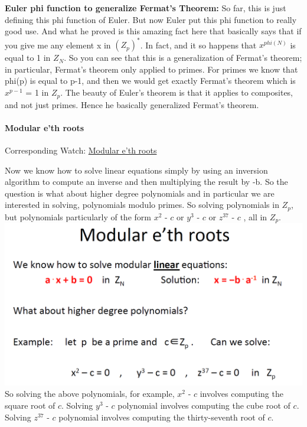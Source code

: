 \documentclass[11pt]{article}
\makeatletter
\def\maxwidth{\ifdim\Gin@nat@width>\linewidth\linewidth
    \else\Gin@nat@width\fi}
\let\Oldincludegraphics\includegraphics
\renewcommand{\includegraphics}[1]{\Oldincludegraphics[width=.8\maxwidth]{#1}}
\makeatother
\begin{document}
\textbf{Euler phi function to generalize Fermat's Theorem:} So far, this
is just defining this phi function of Euler. But now Euler put this phi
function to really good use. And what he proved is this amazing fact
here that basically says that if you give me any element x in
\((Z_{p})^{*}\). In fact, and it so happens that \(x^{phi(N)}\) is equal
to 1 in \(Z_{N}\). So you can see that this is a generalization of
Fermat's theorem; in particular, Fermat's theorem only applied to
primes. For primes we know that phi(p) is equal to p-1, and then we
would get exactly Fermat's theorem which is \(x^{p-1}\) = 1 in
\(Z_{p}\). The beauty of Euler's theorem is that it applies to
composites, and not just primes. Hence he basically generalized Fermat's
theorem.

\hypertarget{modular-eth-roots}{%
\paragraph{Modular e'th roots}\label{modular-eth-roots}}

Corresponding Watch:
\href{https://www.coursera.org/learn/crypto/lecture/fjRVO/modular-e-th-roots}{Modular
e'th roots}

Now we know how to solve linear equations simply by using an inversion
algorithm to compute an inverse and then multiplying the result by -b.
So the question is what about higher degree polynomials and in
particular we are interested in solving, polynomials modulo primes. So
solving polynomials in \(Z_{p}\), but polynomials particularly of the
form \(x^{2}\) - \(c\) or \(y^{3}\) - \(c\) or \(z^{37}\) - \(c\) , all
in \(Z_{p}\). \includegraphics{./Images/NT-HowModularRoot.png} So
solving the above polynomials, for example, \(x^{2}\) - \(c\) involves
computing the square root of \(c\). Solving \(y^{3}\) - \(c\) polynomial
involves computing the cube root of \(c\). Solving \(z^{37}\) - \(c\)
polynomial involves computing the thirty-seventh root of \(c\).
\end{document}
